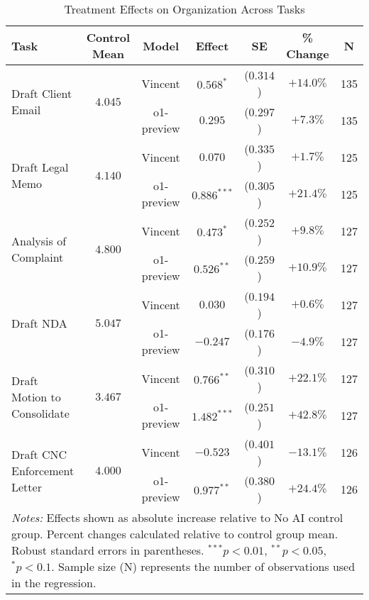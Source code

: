 \begin{table}[!htbp]
\centering
\caption{Treatment Effects on Organization Across Tasks}
\label{tab:organization_effects}
\begin{tabular}{lcccccc}
\hline\hline
Task & Control Mean & Model & Effect & SE & \% Change & N \\
\hline
\multirow{2}{*}{Draft Client Email} & \multirow{2}{*}{$4.045$} & Vincent & $0.568^{*}$ & ($0.314$) & $+14.0\%$ & 135 \\
& & o1-preview & $0.295$ & ($0.297$) & $+7.3\%$ & 135 \\
\hline
\multirow{2}{*}{Draft Legal Memo} & \multirow{2}{*}{$4.140$} & Vincent & $0.070$ & ($0.335$) & $+1.7\%$ & 125 \\
& & o1-preview & $0.886^{***}$ & ($0.305$) & $+21.4\%$ & 125 \\
\hline
\multirow{2}{*}{Analysis of Complaint} & \multirow{2}{*}{$4.800$} & Vincent & $0.473^{*}$ & ($0.252$) & $+9.8\%$ & 127 \\
& & o1-preview & $0.526^{**}$ & ($0.259$) & $+10.9\%$ & 127 \\
\hline
\multirow{2}{*}{Draft NDA} & \multirow{2}{*}{$5.047$} & Vincent & $0.030$ & ($0.194$) & $+0.6\%$ & 127 \\
& & o1-preview & $-0.247$ & ($0.176$) & $-4.9\%$ & 127 \\
\hline
\multirow{2}{*}{Draft Motion to Consolidate} & \multirow{2}{*}{$3.467$} & Vincent & $0.766^{**}$ & ($0.310$) & $+22.1\%$ & 127 \\
& & o1-preview & $1.482^{***}$ & ($0.251$) & $+42.8\%$ & 127 \\
\hline
\multirow{2}{*}{Draft CNC Enforcement Letter} & \multirow{2}{*}{$4.000$} & Vincent & $-0.523$ & ($0.401$) & $-13.1\%$ & 126 \\
& & o1-preview & $0.977^{**}$ & ($0.380$) & $+24.4\%$ & 126 \\
\hline
\multicolumn{7}{p{0.95\linewidth}}{\footnotesize \textit{Notes:} Effects shown as absolute increase relative to No AI control group. Percent changes calculated relative to control group mean. Robust standard errors in parentheses. $^{***}p<0.01$, $^{**}p<0.05$, $^{*}p<0.1$. Sample size (N) represents the number of observations used in the regression.}
\end{tabular}
\end{table}